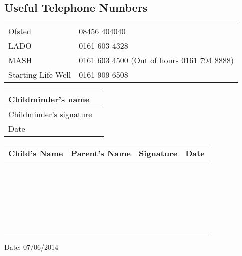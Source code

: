 \subsection{Useful Telephone Numbers}

\begin{table}[h]
  \begin{tabularx}{\textwidth}{lX}
    Ofsted & 08456 404040 \\
    LADO & 0161 603 4328 \\
    MASH & 0161 603 4500 (Out of hours 0161 794 8888) \\
    Starting Life Well & 0161 909 6508 \\ 
 \end{tabularx}
\end{table}

\begin{table}[h]
  \def\arraystretch{2.0}
  \begin{tabularx}{\textwidth}{|l|X|}
    \hline
    Childminder's name & \\
    \hline
    Childminder's signature &  \\
    \hline
    Date & \\
    \hline
  \end{tabularx}
\end{table}

\begin{table}[H]
  \def\arraystretch{2.0}
  \begin{tabularx}{\textwidth}{|X|X|X|X|}
    \hline
    Child's Name & Parent's Name & Signature & Date \\
    \hline
    ~ & ~ & ~ & \\
    \hline
    ~ & ~ & ~ & \\
    \hline
    ~ & ~ & ~ & \\
    \hline
    ~ & ~ & ~ & \\
    \hline
    ~ & ~ & ~ & \\
    \hline
  \end{tabularx}
\end{table}

Date: 07/06/2014


